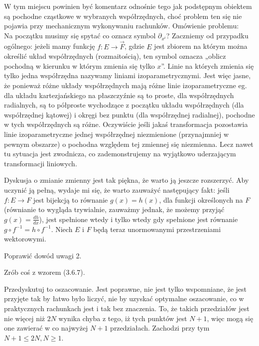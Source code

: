 \documentclass[a4paper,11pt]{article}
\begin{document}
\start {} W tym miejscu powinien być komentarz odnośnie tego
jak podstępnym obiektem są pochodne cząstkowe w wybranych
współrzędnych, choć problem ten się nie pojawia przy mechanicznym
wykonywaniu rachunków.
Omówienie problemu: \\
Na początku musimy się spytać co oznacz symbol $\partial_{ x^{ i } }$?
Zaczniemy od przypadku ogólnego: jeżeli mamy funkcję
$f : E \to \vec{ F }$, gdzie $E$ jest zbiorem na którym można określić
układ współrzędnych (rozmaitością), ten symbol oznacza „oblicz
pochodną w kierunku w którym zmienia się tylko $x$”. Linie na których
zmienia się tylko jedna współrzędna nazywamy liniami
izoparametrycznymi. Jest więc jasne, że ponieważ różne układy
współrzędnych mają różne linie izoparametryczne eg. dla układu
kartezjańskiego na płaszczyźnie są to proste, dla współrzędnych
radialnych, są to półproste wychodzące z początku układu współrzędnych
(dla współrzędnej kątowej) i okręgi bez punktu (dla współrzędnej
radialnej), pochodne w tych współrzędnych są różne. Oczywiście jeśli
jakaś transformacja pozostawia linie izoparametryczne jednej
współrzędnej niezmienione (przynajmniej w pewnym obszarze) o pochodna
względem tej zmiennej się niezmienna. Lecz nawet tu sytuacja jest
zwodnicza, co zademonstrujemy na wyjątkowo uderzającym
transformacji liniowych. \\

\vspace{\spaceFour}


\start {} Dyskusja o zmianie zmienny jest tak piękna, że warto
ją jeszcze rozszerzyć. Aby uczynić ją pełną, wydaje mi się, że warto
zauważyć następujący fakt: jeśli $f : E \to F$ jest bijekcją to równanie
$g( x ) = h( x )$, dla funkcji określonych na $F$ (równianie to
wygląda trywialnie, zauważmy jednak, że możemy przyjąć
$g( x ) = \frac{ d h }{ d x }$), jest spełnione wtedy i tylko wtedy
gdy spełnione jest równanie $g \circ f^{ -1 } = h \circ f^{ -1 }$. Niech
$E$ i $F$ będą teraz unormowanymi przestrzeniami wektorowymi.

\vspace{\spaceFour}


\start {} Poprawić dowód uwagi 2.

\vspace{\spaceFour}


\start {} Zrób coś z wzorem (3.6.7).

\vspace{\spaceFour}


\start {} Przedyskutuj to oszacowanie. Jest poprawne, nie jest
tylko wspomniane, że jest przyjęte tak by łatwo było liczyć, nie by
uzyskać optymalne oszacowanie, co w praktycznych rachunkach jest i tak
bez znaczenia. To, że takich przedziałów jest nie więcej niż $2N$
wynika chyba z tego, iż tych punktów jest $N + 1$, więc mogą się one
zawierać w co najwyżej $N + 1$ przedziałach. Zachodzi przy tym
$N + 1 \leq 2 N, N \geq 1$.
\end{document}
